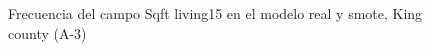 \begin{figure}[H]
    \centering
    
    \caption{Frecuencia del campo Sqft living15 en el modelo real y smote, King county (A-3)}
    \label{frecuency-smote-sqft living15}
\end{figure}